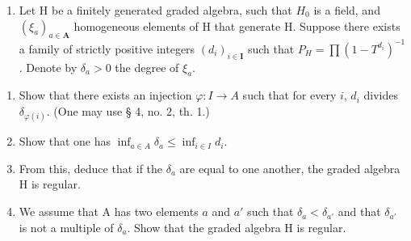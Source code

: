 \begin{enumerate}
\def\labelenumi{\arabic{enumi})}
\setcounter{enumi}{11}
\tightlist
\item
  Let H be a finitely generated graded algebra, such that \(H_{0}\) is a field, and \((\xi_{a})_{a\in\mathbf{A}}\) homogeneous elements of H that generate H. Suppose there exists a family of strictly positive integers \((d_{i})_{i\in\mathbf{I}}\) such that \(P_{H}=\prod(1-T^{d_{i}})^{-1}\). Denote by \(\delta_{a}>0\) the degree of \(\xi_{a}\).
\end{enumerate}

\begin{enumerate}
\def\labelenumi{\alph{enumi})}
\item
  Show that there exists an injection \(\varphi: I \to A\) such that for every \(i\), \(d_i\) divides \(\delta_{\varphi(i)}\). (One may use § 4, no. 2, th. 1.)
\item
  Show that one has \(\inf_{a \in A} \delta_a \leqslant \inf_{i \in I} d_i\).
\item
  From this, deduce that if the \(\delta_{a}\) are equal to one another, the graded algebra H is regular.
\item
  We assume that A has two elements \(a\) and \(a'\) such that \(\delta_{a} < \delta_{a'}\) and that \(\delta_{a'}\) is not a multiple of \(\delta_{a}\). Show that the graded algebra H is regular.
\end{enumerate}

